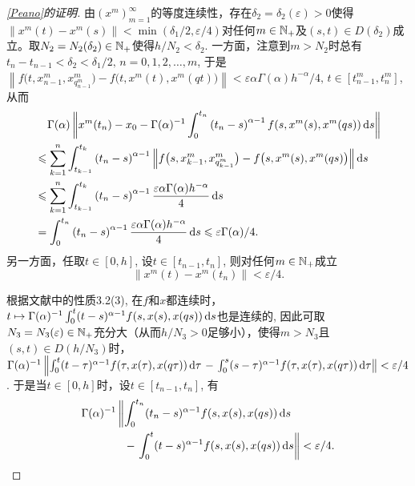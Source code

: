 \begin{proof}[\cref{Peano}的证明]
    由$\left(x^m\right)_{m=1}^\infty$的等度连续性，存在$\delta_2=\delta_2(\varepsilon)>0$使得$\left\|x^m(t)-x^m(s)\right\|<\min \left(\delta_1/2,\allowbreak\varepsilon/4\right)$对任何$m\in \mathbb{N_+}$及$(s,t)\in D\left(\delta_2\right)$成立。取$N_2=N_2(\delta_2)\in \mathbb{N_+}$使得$h/N_2<\delta_2$. 一方面，注意到$m>N_2$时总有$t_n-t_{n-1}<\delta_2<\delta_1/2,\,n=0,1,2,\dots,m$, 于是$\left\|f\bigl(t,x^m_{n-1},x^m_{q^m_{n-1}}\bigr)-f\bigl(t,x^m(t),x^m(qt)\bigr)\right\|<\varepsilon \alpha \Gamma(\alpha) h^{-\alpha} / 4,\,t\in\left[t^m_{n-1},t^m_n\right]$, 从而
    \begin{equation}\label{tn}
        \begin{aligned}
            &\relphantom{\leqslant}\Gamma(\alpha)\left\|x^m(t_n)-x_0-\Gamma(\alpha)^{-1}\int_{0}^{t_n}\left(t_n-s\right)^{\alpha-1}f(s,x^m(s),x^m(qs))\differential s\right\|
            \\ &\leqslant \sum_{k=1}^{n}\int_{t_{k-1}}^{t_k}\left(t_n-s\right)^{\alpha-1}\left\|f\bigl(s,x^m_{k-1},x^m_{q^m_{k-1}}\bigr)-f\bigl(s,x^m(s),x^m(qs)\bigr)\right\|\differential s
            \\ &\leqslant \sum_{k=1}^{n}\int_{t_{k-1}}^{t_k}\left(t_n-s\right)^{\alpha-1} \frac{\varepsilon \alpha \Gamma(\alpha) h^{-\alpha}}{4} \differential s
            \\ &=\int_{0}^{t_n} \left(t_n-s\right)^{\alpha-1} \frac{\varepsilon \alpha \Gamma(\alpha) h^{-\alpha}}{4} \differential s
            \leqslant \varepsilon\Gamma(\alpha)/4.
        \end{aligned}
    \end{equation}
    另一方面，任取$t\in [0,h]$, 设$t\in\left[t_{n-1},t_n\right]$, 则对任何$m\in \mathbb{N_+}$成立
    \begin{equation}\label{xmtnt}
        \left\|x^m(t)-x^m(t_n)\right\|<\varepsilon/4.
    \end{equation}

    根据文献中的性质3.2(3), 在$f$和$x$都连续时，$t\mapsto \Gamma(\alpha)^{-1}\int_{0}^{t}(t-s)^{\alpha-1}f(s,x(s),x(qs))\mathop{}\!\mathrm{d} s$也是连续的, 因此可取$N_3=N_3(\varepsilon)\in \mathbb{N_+}$充分大（从而$h/N_3>0$足够小），使得$m>N_3$且$(s,t)\in D(h/N_3)$时，$\Gamma(\alpha)^{-1}\allowbreak\left\|\int_{0}^{t}(t-\tau)^{\alpha-1}f(\tau,x(\tau),x(q\tau))\mathop{}\!\mathrm{d} \tau\right.\allowbreak-\left.\int_{0}^{s}(s-\tau)^{\alpha-1}f(\tau,x(\tau),x(q\tau))\mathop{}\!\mathrm{d} \tau\right\|\allowbreak <\varepsilon/4$. 于是当$t\in [0,h]$时，设$t\in\left[t_{n-1},t_n\right]$, 有
    \begin{equation}\label{xtnt}
        \begin{aligned}
            \Gamma(\alpha)^{-1}&\left\|\int_{0}^{t_n}(t_n-s)^{\alpha-1}f(s,x(s),x(qs))\differential s\right.
            \\&\phantom{\left\|\vphantom{\int_{0}^{t_n}}\right.}-\left.\int_{0}^{t}(t-s)^{\alpha-1}f(s,x(s),x(qs))\differential s\right\|<\varepsilon/4.
        \end{aligned}
    \end{equation}
    

\end{proof}
